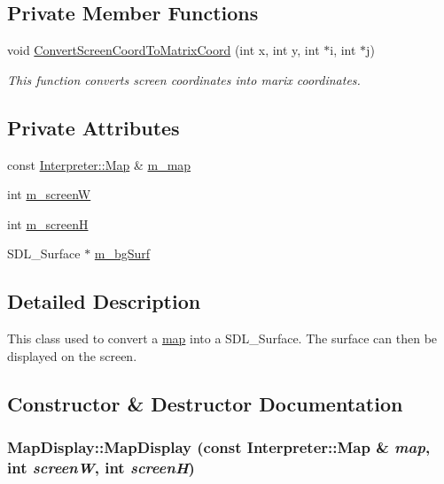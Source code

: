 \subsection*{Private Member Functions}
\begin{DoxyCompactItemize}
\item 
void \hyperlink{classMapDisplay_afd0ef9d9c11103bd966d27a12cd84ed7}{ConvertScreenCoordToMatrixCoord} (int x, int y, int $\ast$i, int $\ast$j)
\begin{DoxyCompactList}\small\item\em This function converts screen coordinates into marix coordinates. \item\end{DoxyCompactList}\end{DoxyCompactItemize}
\subsection*{Private Attributes}
\begin{DoxyCompactItemize}
\item 
const \hyperlink{classMatrix}{Interpreter::Map} \& \hyperlink{classMapDisplay_a218c5b07ae7b9622a606faa613d7eaa9}{m\_\-map}
\item 
int \hyperlink{classMapDisplay_a31f9d5788c440d1ef0fca5729103ab05}{m\_\-screenW}
\item 
int \hyperlink{classMapDisplay_a3a6a2f7b6501945628fbfe022914daed}{m\_\-screenH}
\item 
SDL\_\-Surface $\ast$ \hyperlink{classMapDisplay_a8c4cc4b6d6a5f1608ca2a3eb9a5e3290}{m\_\-bgSurf}
\end{DoxyCompactItemize}


\subsection{Detailed Description}
This class used to convert a \hyperlink{classInterpreter_a4c080f069f557cf92dfe803117a6ea53}{map} into a SDL\_\-Surface. The surface can then be displayed on the screen. 

\subsection{Constructor \& Destructor Documentation}
\hypertarget{classMapDisplay_a3af0dfed1bf4e41a1fe810271593729d}{
\subsubsection[{MapDisplay}]{\setlength{\rightskip}{0pt plus 5cm}MapDisplay::MapDisplay (const {\bf Interpreter::Map} \& {\em map}, \/  int {\em screenW}, \/  int {\em screenH})}}
\label{classMapDisplay_a3af0dfed1bf4e41a1fe810271593729d}



